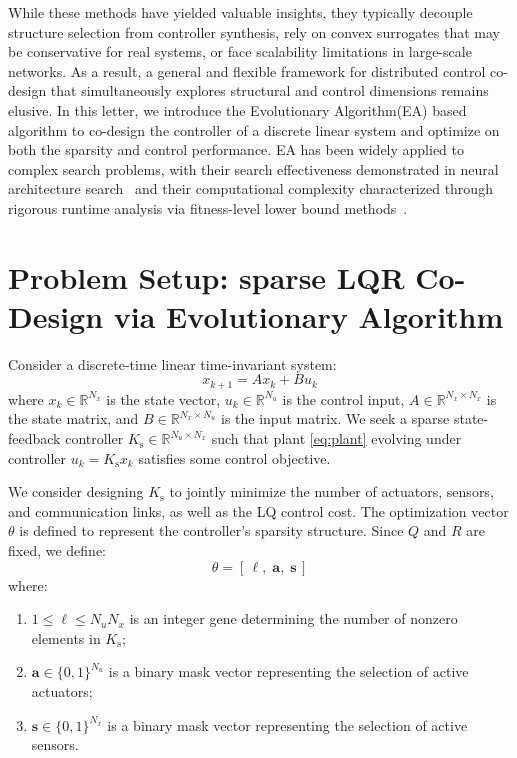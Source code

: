 \documentclass[conference]{IEEEtran}
\begin{document}
 While these methods have yielded valuable insights, they typically decouple structure selection from controller synthesis, rely on convex surrogates that may be conservative for real systems\cite{Regularization}, or face scalability limitations in large-scale networks. As a result, a general and flexible framework for distributed control co-design that simultaneously explores structural and control dimensions remains elusive. In this letter, we introduce the Evolutionary Algorithm(EA) based algorithm to co-design the controller of a discrete linear system and optimize on both the sparsity and control performance. EA has been widely applied to complex search problems, with their search effectiveness demonstrated in neural architecture search~\cite{EA-survey} and their computational complexity characterized through rigorous runtime analysis via fitness-level lower bound methods~\cite{EAtime}.


\section{Problem Setup: sparse LQR Co-Design via Evolutionary Algorithm}

Consider a discrete-time linear time-invariant system:
\begin{equation} \label{eq:plant}
x_{k+1} = A x_k + B u_k
\end{equation}
where $x_k \in \mathbb{R}^{N_x}$ is the state vector, $u_k \in \mathbb{R}^{N_u}$ is the control input, $A \in \mathbb{R}^{N_x \times N_x}$ is the state matrix, and $B \in \mathbb{R}^{N_x \times N_u}$ is the input matrix.
We seek a sparse state-feedback controller $K_{\text{s}} \in \mathbb{R}^{N_u \times N_x}$ such that plant \eqref{eq:plant} evolving under controller $u_k = K_{\text{s}} x_k$ satisfies some control objective.

We consider designing $K_{\text{s}}$ to jointly minimize the number of actuators, sensors, and communication links, as well as the LQ control cost. 
The optimization vector $\theta$ is defined to represent the controller's sparsity structure. Since $Q$ and $R$ are fixed, we define:
\begin{equation}
\theta = [\,\ell, \;\mathbf{a}, \;\mathbf{s}\,]
\end{equation}
where:
\begin{enumerate}
    \item[(a)] $1 \leq \ell \leq N_u N_x$ is an integer gene determining the number of nonzero elements in $K_\mathrm{s}$;
    \item[(b)] $\mathbf{a} \in \{0, 1\}^{N_u}$ is a binary mask vector representing the selection of active actuators;
    \item[(c)] $\mathbf{s} \in \{0, 1\}^{N_x}$ is a binary mask vector representing the selection of active sensors.
\end{enumerate}
\end{document}
